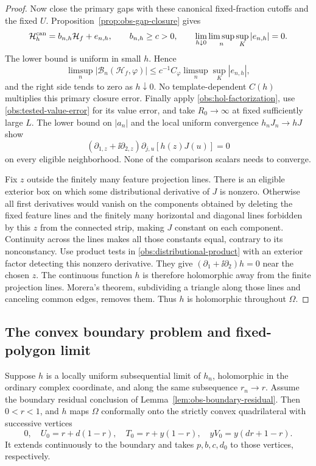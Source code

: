 \begin{proof}
Now close the primary gaps with these canonical fixed-fraction
cutoffs and the fixed $U$.  Proposition~\ref{prop:obs-gap-closure}
gives
\[
 \mathcal H_h^{\rm can}=b_{n,h}\mathcal H_f+e_{n,h},\qquad
 b_{n,h}\ge c>0,\qquad
 \lim_{h\downarrow0}\limsup_n\sup_K|e_{n,h}|=0.
\]
The lower bound is uniform in small $h$.  Hence
\[
 \limsup_n|\mathcal B_n(\mathcal H_f,\varphi)|
 \le c^{-1}C_\varphi\limsup_n\sup_K|e_{n,h}|,
\]
and the right side tends to zero as $h\downarrow0$.  No
template-dependent $C(h)$ multiplies this primary closure error.
Finally apply \eqref{obs:hol-factorization}, use
\eqref{obs:tested-value-error} for its value error, and take
$R_0\to\infty$ at fixed sufficiently large $L$.  The lower bound
on $|a_n|$ and the local uniform convergence $h_nJ_n\to hJ$ show
\begin{equation}
 (\partial_{1,z}+\ii\partial_{2,z})\partial_{j,u}
              [h(z)J(u)]=0
 \label{obs:distributional-product}
\end{equation}
on every eligible neighborhood.  None of the comparison scalars
needs to converge.

Fix $z$ outside the finitely many feature projection lines.
There is an eligible exterior box on which some distributional
derivative of $J$ is nonzero.  Otherwise all first derivatives
would vanish on the components obtained by deleting the fixed
feature lines and the finitely many horizontal and diagonal lines
forbidden by this $z$ from the connected strip, making $J$
constant on each component.  Continuity across the lines makes
all those constants equal, contrary to its nonconstancy.
Use product tests in \eqref{obs:distributional-product} with an
exterior factor detecting this nonzero derivative.  They give
$(\partial_1+\ii\partial_2)h=0$ near the chosen $z$.
The continuous function $h$ is therefore holomorphic away from
the finite projection lines.  Morera's theorem, subdividing a
triangle along those lines and canceling common edges, removes
them.  Thus $h$ is holomorphic throughout $\Omega$.
\end{proof}

\subsection{The convex boundary problem and fixed-polygon limit}

\begin{proposition}
\label{prop:obs-boundary-map}
Suppose $h$ is a locally uniform subsequential limit of $h_n$,
holomorphic in the ordinary complex coordinate, and along the
same subsequence
$r_n\to r$.
Assume the boundary residual conclusion of
Lemma~\ref{lem:obs-boundary-residual}.  Then $0<r<1$, and $h$ maps
$\Omega$ conformally onto the strictly convex quadrilateral with
successive vertices
\begin{equation}
 0,\quad U_0=r+d(1-r),\quad T_0=r+y(1-r),
 \quad yV_0=y(dr+1-r).
 \label{obs:target-vertices}
\end{equation}
It extends continuously to the boundary and takes
$p,b,c,d_0$ to those vertices, respectively.
\end{proposition}

